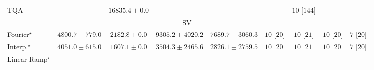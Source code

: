 \begin{tabular}{l|cccc|cccc|}
TQA & {\cellcolor[HTML]{000000}} \color[HTML]{F1F1F1} {\cellcolor{white}} \color{black} - & {\cellcolor[HTML]{49AF61}} \color[HTML]{F1F1F1} $16835.4\pm 0.0$ & {\cellcolor[HTML]{000000}} \color[HTML]{F1F1F1} {\cellcolor{white}} \color{black} - & {\cellcolor[HTML]{000000}} \color[HTML]{F1F1F1} {\cellcolor{white}} \color{black} - & {\cellcolor[HTML]{000000}} \color[HTML]{F1F1F1} {\cellcolor{white}} \color{black} - & {\cellcolor[HTML]{49006A}} \color[HTML]{F1F1F1} $10$ [$144$] & {\cellcolor[HTML]{000000}} \color[HTML]{F1F1F1} {\cellcolor{white}} \color{black} - & {\cellcolor[HTML]{000000}} \color[HTML]{F1F1F1} {\cellcolor{white}} \color{black} - \\
\cline{1-9}
\multicolumn{9}{c}{\rule{0pt}{8pt}SV} \\
\midrule
Fourier$^\star$ & {\cellcolor[HTML]{96B6D7}} \color[HTML]{000000} $4800.7\pm 779.0$ & {\cellcolor[HTML]{F4EDF6}} \color[HTML]{000000} $2182.8\pm 0.0$ & {\cellcolor[HTML]{023858}} \color[HTML]{F1F1F1} $9305.2\pm 4020.2$ & {\cellcolor[HTML]{0569A4}} \color[HTML]{F1F1F1} $7689.7\pm 3060.3$ & {\cellcolor[HTML]{49006A}} \color[HTML]{F1F1F1} $10$ [$20$] & {\cellcolor[HTML]{49006A}} \color[HTML]{F1F1F1} $10$ [$21$] & {\cellcolor[HTML]{49006A}} \color[HTML]{F1F1F1} $10$ [$20$] & {\cellcolor[HTML]{CD238F}} \color[HTML]{F1F1F1} $7$ [$20$] \\
Interp.$^\star$ & {\cellcolor[HTML]{B9C6E0}} \color[HTML]{000000} $4051.0\pm 615.0$ & {\cellcolor[HTML]{FFF7FB}} \color[HTML]{000000} $1607.1\pm 0.0$ & {\cellcolor[HTML]{D1D2E6}} \color[HTML]{000000} $3504.3\pm 2465.6$ & {\cellcolor[HTML]{E5E1EF}} \color[HTML]{000000} $2826.1\pm 2759.5$ & {\cellcolor[HTML]{49006A}} \color[HTML]{F1F1F1} $10$ [$20$] & {\cellcolor[HTML]{49006A}} \color[HTML]{F1F1F1} $10$ [$21$] & {\cellcolor[HTML]{49006A}} \color[HTML]{F1F1F1} $10$ [$20$] & {\cellcolor[HTML]{CD238F}} \color[HTML]{F1F1F1} $7$ [$20$] \\
Linear Ramp$^\star$ & {\cellcolor[HTML]{000000}} \color[HTML]{F1F1F1} {\cellcolor{white}} \color{black} - & {\cellcolor[HTML]{000000}} \color[HTML]{F1F1F1} {\cellcolor{white}} \color{black} - & {\cellcolor[HTML]{000000}} \color[HTML]{F1F1F1} {\cellcolor{white}} \color{black} - & {\cellcolor[HTML]{000000}} \color[HTML]{F1F1F1} {\cellcolor{white}} \color{black} - & {\cellcolor[HTML]{000000}} \color[HTML]{F1F1F1} {\cellcolor{white}} \color{black} - & {\cellcolor[HTML]{000000}} \color[HTML]{F1F1F1} {\cellcolor{white}} \color{black} - & {\cellcolor[HTML]{000000}} \color[HTML]{F1F1F1} {\cellcolor{white}} \color{black} - & {\cellcolor[HTML]{000000}} \color[HTML]{F1F1F1} {\cellcolor{white}} \color{black} - \\

\end{tabular}
